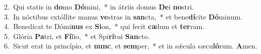 {2.~}Qui statis in \textbf{do}mo \textbf{Dó}mini,~* in átriis domus \textbf{De}i \textbf{no}stri.\\
{3.~}In nóctibus extóllite manus \textbf{ve}stras in \textbf{san}cta,~* et bene\textbf{dí}cite \textbf{Dó}minum.\\
{4.~}Benedícat te Dómi\textbf{nus} ex \textbf{Si}on,~* qui fecit \textbf{cæ}lum et \textbf{ter}ram.\\
{5.~}Glória \textbf{Pa}tri, et \textbf{Fí}lio,~* et Spi\textbf{rí}tui \textbf{San}cto.\\
{6.~}Sicut erat in princípio, et \textbf{nunc}, et \textbf{sem}per,~* et in sǽcula sæcu\textbf{ló}rum. \textbf{A}men.\\
